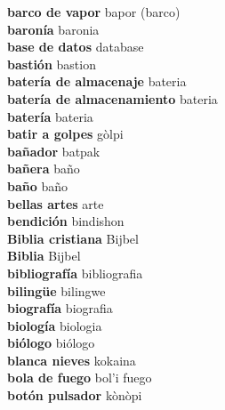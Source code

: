 \textbf{ barco de vapor  } bapor (barco) \\
\textbf{ baronía  } baronia \\
\textbf{ base de datos  } database \\
\textbf{ bastión  } bastion \\
\textbf{ batería de almacenaje  } bateria \\
\textbf{ batería de almacenamiento  } bateria \\
\textbf{ batería  } bateria \\
\textbf{ batir a golpes  } gòlpi \\
\textbf{ bañador  } batpak \\
\textbf{ bañera  } baño \\
\textbf{ baño  } baño \\
\textbf{ bellas artes  } arte \\
\textbf{ bendición  } bindishon \\
\textbf{ Biblia cristiana  } Bijbel \\
\textbf{ Biblia  } Bijbel \\
\textbf{ bibliografía  } bibliografia \\
\textbf{ bilingüe  } bilingwe \\
\textbf{ biografía  } biografia \\
\textbf{ biología  } biologia \\
\textbf{ biólogo  } biólogo \\
\textbf{ blanca nieves  } kokaina \\
\textbf{ bola de fuego  } bol’i fuego \\
\textbf{ botón pulsador  } kònòpi \\
